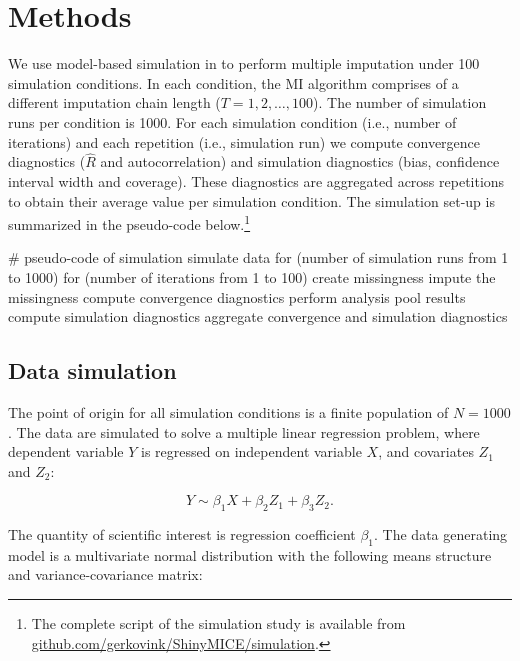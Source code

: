 \documentclass[article]{jss}
\begin{document}

\section{Methods} \label{sec:methods}

We use model-based simulation in  to perform multiple imputation under 100 simulation conditions. In each condition, the MI algorithm comprises of a different imputation chain length ($T = 1, 2, \dots, 100$). The number of simulation runs per condition is 1000. For each simulation condition (i.e., number of iterations) and each repetition (i.e., simulation run) we compute convergence diagnostics ($\widehat{R}$ and autocorrelation) and simulation diagnostics (bias, confidence interval width and coverage). These diagnostics are aggregated across repetitions to obtain their average value per simulation condition.
The simulation set-up is summarized in the pseudo-code below.\footnote{The complete  script of the simulation study is available from \href{https://github.com/gerkovink/shinyMice/simulation}{github.com/gerkovink/ShinyMICE/simulation}.}

\begin{Code}
# pseudo-code of simulation 
simulate data 
for (number of simulation runs from 1 to 1000)
  for (number of iterations from 1 to 100)
    create missingness
    impute the missingness
    compute convergence diagnostics
    perform analysis
    pool results
    compute simulation diagnostics
aggregate convergence and simulation diagnostics
\end{Code}

\subsection{Data simulation}

The point of origin for all simulation conditions is a finite population of $N=1000$. The data are simulated to solve a multiple linear regression problem, where dependent variable $Y$ is regressed on independent variable $X$, and covariates $Z_1$ and $Z_2$: 

$$Y \sim \beta_1 X + \beta_2 Z_1 + \beta_3 Z_2.$$

The quantity of scientific interest is regression coefficient $\beta_1$. The data generating model is a multivariate normal distribution with the following means structure and variance-covariance matrix: 
\end{document}
